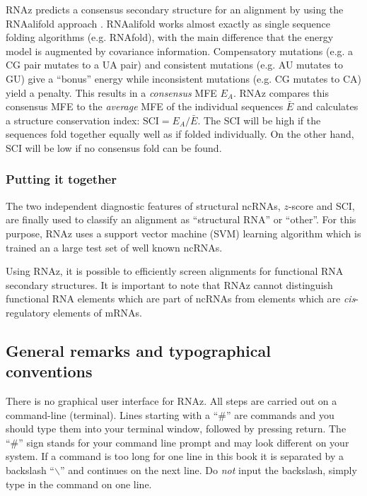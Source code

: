 \documentclass[11pt]{article}
\begin{document}
RNAz predicts a consensus secondary structure for an alignment by using the
RNAalifold approach \cite{hofacker02}. RNAalifold works almost exactly as
single sequence folding algorithms (e.g. RNAfold), with the main difference
that the energy model is augmented by covariance information. Compensatory
mutations (e.g. a CG pair mutates to a UA pair) and consistent mutations
(e.g. AU mutates to GU) give a ``bonus'' energy while inconsistent
mutations (e.g. CG mutates to CA) yield a penalty. This results in a
\emph{consensus} MFE $E_A$. RNAz compares this consensus MFE to the
\emph{average} MFE of the individual sequences $\bar E$ and calculates a
structure conservation index: $\textrm{SCI}= E_A/\bar E $. The SCI will be
high if the sequences fold together equally well as if folded individually.
On the other hand, SCI will be low if no consensus fold can be found.

\subsubsection{Putting it together}

The two independent diagnostic features of structural ncRNAs, $z$-score and
SCI, are finally used to classify an alignment as ``structural RNA'' or
``other''. For this purpose, RNAz uses a support vector machine (SVM)
learning algorithm which is trained an a large test set of well known
ncRNAs.

Using RNAz, it is possible to efficiently screen alignments for functional
RNA secondary structures. It is important to note that RNAz cannot
distinguish functional RNA elements which are part of ncRNAs from elements
which are \emph{cis}-regulatory elements of mRNAs.

\subsection{General remarks and typographical conventions}

There is no graphical user interface for RNAz. All steps are carried out on
a command-line (terminal). Lines starting with a ``\#'' are commands and
you should type them into your terminal window, followed by pressing
return. The ``\#'' sign stands for your command line prompt and may look
different on your system. If a command is too long for one line in this
book it is separated by a backslash ``\texttt{$\backslash$}'' and continues
on the next line. Do \emph{not} input the backslash, simply type in the
command on one line.
\end{document}
